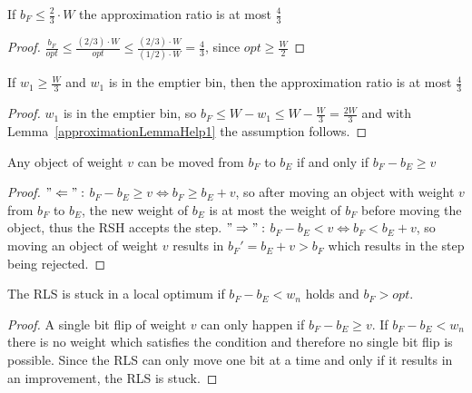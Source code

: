 \begin{lemma}\label{approximationLemmaHelp1}
    If \(b_F \le \frac{2}{3} \cdot W\) the approximation ratio is at most $\frac{4}{3}$
\end{lemma}
\begin{proof}
    \(\frac{b_F}{opt} \le \frac{(2/3) \cdot W}{opt} \le \frac{(2/3) \cdot W}{(1/2) \cdot W} = \frac{4}{3}\), since \(opt \ge \frac{W}{2}\)
\end{proof}

\begin{corollary}\label{approximationCorollaryHelp2}
    If \(w_1 \ge \frac{W}{3}\) and \(w_1\) is in the emptier bin, then the approximation ratio is at most $\frac{4}{3}$
\end{corollary}
\begin{proof}
    $w_1$ is in the emptier bin, so \( b_F \le W - w_1 \le W - \frac{W}{3} = \frac{2W}{3} \) and with Lemma~\ref{approximationLemmaHelp1} the assumption follows.
\end{proof}

\begin{lemma}\label{movingObjectsLemma}
    Any object of weight $v$ can be moved from $b_F$ to $b_E$ if and only if \(b_F - b_E \ge v\)
\end{lemma}
\begin{proof}
    $"\Leftarrow":$\newline
    \(b_F - b_E \ge v \Leftrightarrow b_F \ge b_E + v\), so after moving an object with weight $v$ from $b_F$ to $b_E$, the new weight of $b_E$ is at most the weight of $b_F$ before moving the object, thus the RSH accepts the step.\newline
    $"\Rightarrow":$\newline
    \(b_F - b_E < v \Leftrightarrow b_F < b_E + v\), so moving an object of weight $v$ results in ${b_F}' = b_E+v > b_F$ which results in the step being rejected.
\end{proof}

\begin{corollary}\label{cor:RLSStuck}
    The RLS is stuck in a local optimum if \(b_F-b_E < w_n\) holds and \(b_F > opt\).
\end{corollary}
\begin{proof}
    A single bit flip of weight $v$ can only happen if \(b_F - b_E \ge v\). If \(b_F-b_E < w_n\) there is no weight which satisfies the condition and therefore no single bit flip is possible.
    Since the RLS can only move one bit at a time and only if it results in an improvement, the RLS is stuck.
\end{proof}

